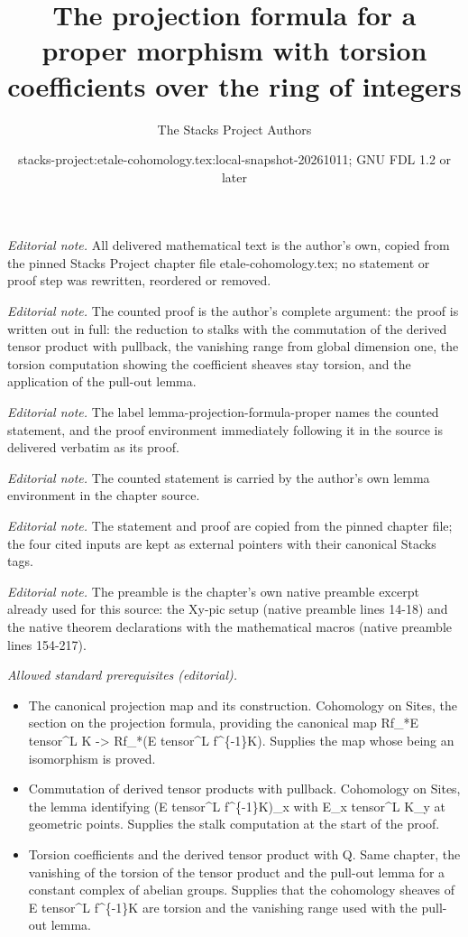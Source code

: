 \documentclass[10pt,a4paper]{amsart}
\title{The projection formula for a proper morphism with torsion coefficients over the ring of integers}
\author{The Stacks Project Authors}
\date{stacks-project:etale-cohomology.tex:local-snapshot-20261011; GNU FDL 1.2 or later}
\theoremstyle{plain}
\theoremstyle{definition}
\theoremstyle{remark}
\numberwithin{equation}{subsection}
\begin{document}
\maketitle
\noindent\textit{Editorial note.} All delivered mathematical text is the author's own, copied from the pinned Stacks Project chapter file etale-cohomology.tex; no statement or proof step was rewritten, reordered or removed.\par\medskip
\noindent\textit{Editorial note.} The counted proof is the author's complete argument: the proof is written out in full: the reduction to stalks with the commutation of the derived tensor product with pullback, the vanishing range from global dimension one, the torsion computation showing the coefficient sheaves stay torsion, and the application of the pull-out lemma.\par\medskip
\noindent\textit{Editorial note.} The label lemma-projection-formula-proper names the counted statement, and the proof environment immediately following it in the source is delivered verbatim as its proof.\par\medskip
\noindent\textit{Editorial note.} The counted statement is carried by the author's own lemma environment in the chapter source.\par\medskip
\noindent\textit{Editorial note.} The statement and proof are copied from the pinned chapter file; the four cited inputs are kept as external pointers with their canonical Stacks tags.\par\medskip
\noindent\textit{Editorial note.} The preamble is the chapter's own native preamble excerpt already used for this source: the Xy-pic setup (native preamble lines 14-18) and the native theorem declarations with the mathematical macros (native preamble lines 154-217).\par\medskip
\noindent\textit{Allowed standard prerequisites (editorial).}\begin{itemize}
\item The canonical projection map and its construction. Cohomology on Sites, the section on the projection formula, providing the canonical map Rf\_*E tensor\textasciicircum{}L K -> Rf\_*(E tensor\textasciicircum{}L f\textasciicircum{}\{-1\}K). Supplies the map whose being an isomorphism is proved.
\item Commutation of derived tensor products with pullback. Cohomology on Sites, the lemma identifying (E tensor\textasciicircum{}L f\textasciicircum{}\{-1\}K)\_x with E\_x tensor\textasciicircum{}L K\_y at geometric points. Supplies the stalk computation at the start of the proof.
\item Torsion coefficients and the derived tensor product with Q. Same chapter, the vanishing of the torsion of the tensor product and the pull-out lemma for a constant complex of abelian groups. Supplies that the cohomology sheaves of E tensor\textasciicircum{}L f\textasciicircum{}\{-1\}K are torsion and the vanishing range used with the pull-out lemma.
\end{itemize}\medskip
\end{document}
